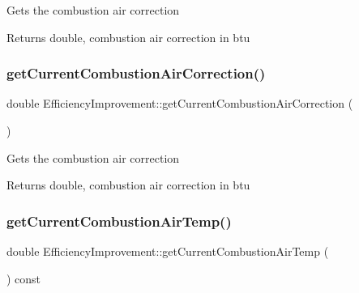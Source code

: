 Gets the combustion air correction

\begin{DoxyReturn}{Returns}
double, combustion air correction in btu 
\end{DoxyReturn}
\mbox{\label{class_efficiency_improvement_af50c396ac8ee18f594d6e8b8814f056a}} 
\subsubsection{\texorpdfstring{get\+Current\+Combustion\+Air\+Correction()}{getCurrentCombustionAirCorrection()}\hspace{0.1cm}{\footnotesize\ttfamily [3/3]}}
{\footnotesize\ttfamily double Efficiency\+Improvement\+::get\+Current\+Combustion\+Air\+Correction (\begin{DoxyParamCaption}{ }\end{DoxyParamCaption})}

Gets the combustion air correction

\begin{DoxyReturn}{Returns}
double, combustion air correction in btu 
\end{DoxyReturn}
\mbox{\label{class_efficiency_improvement_aa2f9d297f3c31e249c7a8035fd5602f1}} 
\subsubsection{\texorpdfstring{get\+Current\+Combustion\+Air\+Temp()}{getCurrentCombustionAirTemp()}\hspace{0.1cm}{\footnotesize\ttfamily [1/3]}}
{\footnotesize\ttfamily double Efficiency\+Improvement\+::get\+Current\+Combustion\+Air\+Temp (\begin{DoxyParamCaption}{ }\end{DoxyParamCaption}) const\hspace{0.3cm}{\ttfamily [inline]}}

